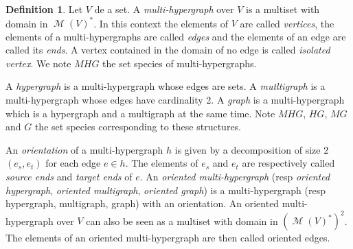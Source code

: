 \documentclass[a4paper]{article}
\DeclareMathOperator{\m}{\mathcal{M}}
\theoremstyle{definition}
\newtheorem{definition}{Definition}
\begin{document}
\begin{definition}
Let $V$ de a set. A \textit{multi-hypergraph} over $V$ is a multiset with domain in $\m(V)^*$. In this context the elements of $V$ are called \textit{vertices}, the elements of a multi-hypergraphs are called \textit{edges} and the elements of an edge are called its \textit{ends}. A vertex contained in the domain of no edge is called \textit{isolated vertex}. We note $MHG$ the set species of multi-hypergraphs.

A \textit{hypergraph} is a multi-hypergraph whose edges are sets. A \textit{mutltigraph} is a multi-hypergraph whose edges have cardinality 2. A \textit{graph} is a multi-hypergraph which is a hypergraph and a multigraph at the same time. Note $MHG$, $HG$, $MG$ and $G$ the set species corresponding to these structures.

 An \textit{orientation} of a multi-hypergraph $h$ is given by a decomposition of size 2 $(e_s,e_t)$ for each edge $e\in h$. The elements of $e_s$ and $e_t$ are respectively called \textit{source ends} and \textit{target ends} of $e$. An \textit{oriented multi-hypergraph} (resp \textit{oriented hypergraph}, \textit{oriented multigraph}, \textit{oriented graph}) is a multi-hypergraph (resp hypergraph, multigraph, graph) with an orientation. An oriented multi-hypergraph over $V$ can also be seen as a multiset with domain in $(\m(V)^*)^2$. The elements of an oriented multi-hypergraph are then called oriented edges.
\end{definition}
\end{document}
